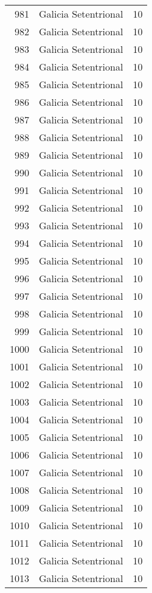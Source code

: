 \begin{table}[p]
\begin{tabular}{rlr}
  981 & Galicia Setentrional &  10 \\ 
  982 & Galicia Setentrional &  10 \\ 
  983 & Galicia Setentrional &  10 \\ 
  984 & Galicia Setentrional &  10 \\ 
  985 & Galicia Setentrional &  10 \\ 
  986 & Galicia Setentrional &  10 \\ 
  987 & Galicia Setentrional &  10 \\ 
  988 & Galicia Setentrional &  10 \\ 
  989 & Galicia Setentrional &  10 \\ 
  990 & Galicia Setentrional &  10 \\ 
  991 & Galicia Setentrional &  10 \\ 
  992 & Galicia Setentrional &  10 \\ 
  993 & Galicia Setentrional &  10 \\ 
  994 & Galicia Setentrional &  10 \\ 
  995 & Galicia Setentrional &  10 \\ 
  996 & Galicia Setentrional &  10 \\ 
  997 & Galicia Setentrional &  10 \\ 
  998 & Galicia Setentrional &  10 \\ 
  999 & Galicia Setentrional &  10 \\ 
  1000 & Galicia Setentrional &  10 \\ 
  1001 & Galicia Setentrional &  10 \\ 
  1002 & Galicia Setentrional &  10 \\ 
  1003 & Galicia Setentrional &  10 \\ 
  1004 & Galicia Setentrional &  10 \\ 
  1005 & Galicia Setentrional &  10 \\ 
  1006 & Galicia Setentrional &  10 \\ 
  1007 & Galicia Setentrional &  10 \\ 
  1008 & Galicia Setentrional &  10 \\ 
  1009 & Galicia Setentrional &  10 \\ 
  1010 & Galicia Setentrional &  10 \\ 
  1011 & Galicia Setentrional &  10 \\ 
  1012 & Galicia Setentrional &  10 \\ 
  1013 & Galicia Setentrional &  10 \\ 

\end{tabular}
\end{table}

